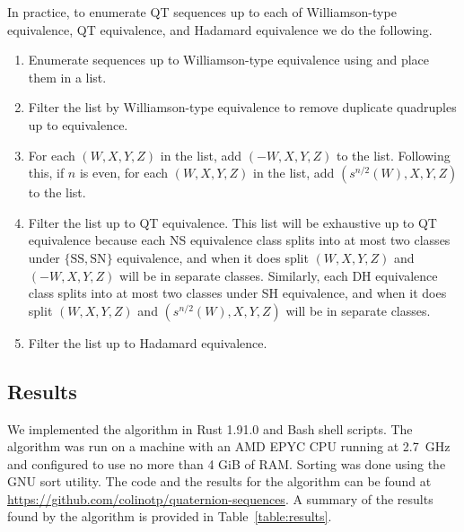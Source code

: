 \documentclass[12pt]{article}
\numberwithin{equation}{section}
\begin{document}
In practice, to enumerate QT sequences up to each of Williamson-type equivalence, QT equivalence, and Hadamard equivalence we
do the following.
\begin{enumerate}
\item Enumerate sequences up to Williamson-type equivalence using  and place them in a list.
\item Filter the list by Williamson-type equivalence to remove duplicate quadruples up to equivalence.
\item For each $(W,X,Y,Z)$ in the list, add $(-W,X,Y,Z)$ to the list.
Following this, if $n$ is even, for each $(W,X,Y,Z)$ in the list, add $(s^{n/2}(W),X,Y,Z)$
to the list.
\item Filter the list up to QT equivalence.
This list will be exhaustive up to QT equivalence because
each NS equivalence class splits
into at most two classes under $\{\text{SS},\text{SN}\}$ equivalence, and
when it does split $(W,X,Y,Z)$ and $(-W,X,Y,Z)$ will be in separate classes.
Similarly, each DH equivalence
class splits into at most two classes under SH equivalence, and when it does
split $(W,X,Y,Z)$ and $(s^{n/2}(W),X,Y,Z)$ will be in separate classes.
\item Filter the list up to Hadamard equivalence.
\end{enumerate}

\subsection{Results}\label{sec:results}

We implemented the algorithm in Rust 1.91.0 and Bash shell scripts.
The algorithm was run on a machine with an AMD EPYC CPU running at 2.7~GHz and configured
to use no more than 4 GiB of RAM\@.
Sorting was done using the GNU sort utility.
The code and the results for the algorithm can be found at \url{https://github.com/colinotp/quaternion-sequences}.
A summary of the results found by the algorithm is provided in Table~\ref{table:results}.
\end{document}
